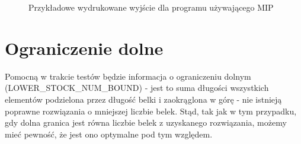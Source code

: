 \begin{figure}[H]
	
	\caption{Przykładowe wydrukowane wyjście dla programu używającego MIP}
	\label{output_example}
\end{figure}

\section{Ograniczenie dolne}
Pomocną w trakcie testów będzie informacja o ograniczeniu dolnym (LOWER\_STOCK\_NUM\_BOUND) - jest to suma długości wszystkich elementów podzielona przez długość belki i zaokrąglona w górę - nie istnieją poprawne rozwiązania o mniejszej liczbie belek. Stąd, tak jak w tym przypadku, gdy dolna granica jest równa liczbie belek z uzyskanego rozwiązania, możemy mieć pewność, że jest ono optymalne pod tym względem.








